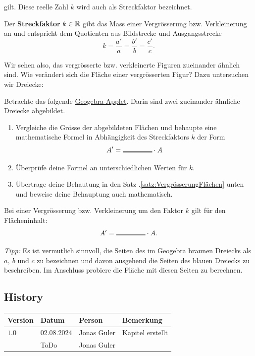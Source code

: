\documentclass[11pt,oneside]{article}
\begin{document}
gilt. Diese reelle Zahl $k$ wird auch als Streckfaktor bezeichnet.
\begin{definition}[Streckfaktor]
	Der \textbf{Streckfaktor} $k\in\mathbb{R}$ gibt das Mass einer Vergrösserung bzw. Verkleinerung an und entspricht dem Quotienten aus Bildstrecke und Ausgangsstrecke \[k=\frac{a'}{a}=\frac{b'}{b}=\frac{c'}{c}.\]
\end{definition}
Wir sehen also, das vergrösserte bzw. verkleinerte Figuren zueinander ähnlich sind. Wie verändert sich die Fläche einer vergrösserten Figur? Dazu untersuchen wir Dreiecke:
\begin{aufgabe}
	Betrachte das folgende \href{https://www.geogebra.org/m/afqa8scd}{Geogebra-Applet}. Darin sind zwei zueinander ähnliche Dreiecke abgebildet.
	\begin{enumerate}[label=\alph*)]
		\item Vergleiche die Grösse der abgebildeten Flächen und behaupte eine mathematische Formel in Abhängigkeit des Streckfaktors $k$ der Form \[A'=\gap{1.5}\*A\]
		\item Überprüfe deine Formel an unterschiedlichen Werten für $k$.
	\end{enumerate}
	\vspace{5pt}
	\begin{enumerate}[label=\alph*)]\setcounter{enumi}{2}
		\item Übertrage deine Behautung in den Satz \thesection.\ref{satz:VergrösserungFlächen} unten und beweise deine Behauptung auch mathematisch.
	\end{enumerate}
\end{aufgabe}
\begin{satz}\label{satz:VergrösserungFlächen}
	Bei einer Vergrösserung bzw. Verkleinerung um den Faktor $k$ gilt für den Flächeninhalt: \[A'=\gap{1.5}\*A.\]
\end{satz}
\begin{beweis}
	\textit{Tipp:} Es ist vermutlich sinnvoll, die Seiten des im Geogebra braunen Dreiecks als $a,\: b$ und $c$ zu bezeichnen und davon ausgehend die Seiten des blauen Dreiecks zu beschreiben. Im Anschluss probiere die Fläche mit diesen Seiten zu berechnen.
	\vspace{5pt}\newline{}
\end{beweis}


\newpage
\subsection*{History}
\begin{table}[H]
	\centering
	\begin{tabular}{|p{13mm}|p{20mm}|p{30mm}|p{70mm}|}\hline
		Version & Datum & Person & Bemerkung \\\hline
		$1.0$ & 02.08.2024 & Jonas Guler & Kapitel erstellt \\\hline
		& ToDo & Jonas Guler & \\\hline
	\end{tabular}
\end{table}
\end{document}
